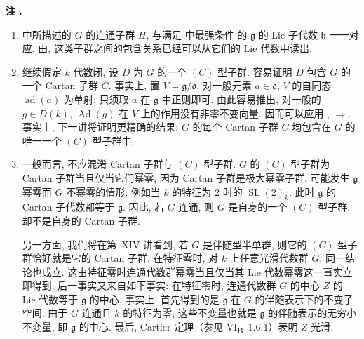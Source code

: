 \par\medskip
\noindent{}%
\textbf{注 \thetheorem.}
\begin{enumerate}
  \item[a)]
   中所描述的 \(G\) 的连通子群 \(H\), 与满足 中最强条件  的 \(\mathfrak g\) 的 Lie 子代数 \(\mathfrak h\) 一一对应. 由, 这类子群之间的包含关系已经可以从它们的 Lie 代数中读出.

  \item[b)]
  继续假定 \(k\) 代数闭, 设 \(D\) 为 \(G\) 的一个 \((C)\) 型子群. 容易证明 \(D\) 包含 \(G\) 的一个 Cartan 子群 \(C\). 事实上, 置 \(V=\mathfrak g/\mathfrak d\). 对一般元素 \(a\in\mathfrak d\), \(V\) 的自同态 \(\operatorname{ad}(a)\) 为单射; 只须取 \(a\) 在 \(\mathfrak g\) 中正则即可. 由此容易推出, 对一般的 \(g\in D(k)\), \(\operatorname{Ad}(g)\) 在 \(V\) 上的作用没有非零不变向量. 因而可以应用 , \(\Rightarrow\). 事实上, 下一讲将证明更精确的结果: \(G\) 的每个 Cartan 子群 \(C\) 均包含在 \(G\) 的唯一一个 \((C)\) 型子群中.

  \item[c)]
  一般而言, 不应混淆 Cartan 子群与 \((C)\) 型子群. \(G\) 的 \((C)\) 型子群为 Cartan 子群当且仅当它们幂零, 因为 Cartan 子群是极大幂零子群. 可能发生 \(\mathfrak g\) 幂零而 \(G\) 不幂零的情形; 例如当 \(k\) 的特征为 \(2\) 时的 \(\operatorname{SL}(2)_k\). 此时 \(\mathfrak g\) 的 Cartan 子代数都等于 \(\mathfrak g\). 因此, 若 \(G\) 连通, 则 \(G\) 是自身的一个 \((C)\) 型子群, 却不是自身的 Cartan 子群.

  另一方面, 我们将在第~XIV 讲看到, 若 \(G\) 是伴随型半单群, 则它的 \((C)\) 型子群恰好就是它的 Cartan 子群. 在特征零时, 对 \(k\) 上任意光滑代数群 \(G\), 同一结论也成立. 这由特征零时连通代数群幂零当且仅当其 Lie 代数幂零这一事实立即得到. 后一事实又来自如下事实: 在特征零时, 连通代数群 \(G\) 的中心 \(Z\) 的 Lie 代数等于 \(\mathfrak g\) 的中心. 事实上, 首先得到的是 \(\mathfrak g\) 在 \(G\) 的伴随表示下的不变子空间. 由于 \(G\) 连通且 \(k\) 的特征为零, 这些不变量也就是 \(\mathfrak g\) 的伴随表示的无穷小不变量, 即 \(\mathfrak g\) 的中心. 最后, Cartier 定理（参见 VI\textsubscript{B}~1.6.1）表明 \(Z\) 光滑.
\end{enumerate}



